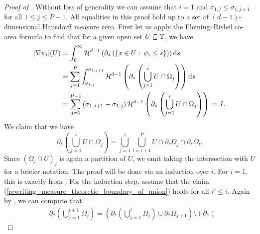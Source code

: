 \begin{proof}[Proof of ]
	Without loss of generality we can assume that $ i = 1 $ and $ \sigma_{ 1, j } \leq \sigma_{ 1, j + 1 } $ for all $ 1 \leq j \leq P - 1 $. 
	All equalities in this proof hold up to a set of $ (d-1)$-dimensional Hausdorff measure zero. First let us apply the Fleming--Rishel co-area formula to find that for a given open set $ U \subseteq \operatorname{\mathbb{T}} $, we have
	\begin{align*}
		\abs{ \nabla \psi_{ i } } ( U ) 
		& =
		\int_{ 0 }^{ \infty }
		\operatorname{\mathcal{H}}^{ d - 1 } \left(
		\partial_{ \ast } \left(
		\left\{
		x \in U 
		\, \colon \,
		\psi_{ i } \leq s 
		\right\}
		\right)
		\right)
		\dd{ s }
		\\
		& =
		\sum_{ j = 1 }^{ P }
		\int_{ \sigma_{ 1, j } }^{ \sigma_{ 1, j + 1 } }
		\operatorname{\mathcal{H}}^{ d - 1 } \left(
		\partial_{ \ast } \left(
		\bigcup_{ j = 1 }^{ i }
		U \cap \Omega_{ j }
		\right)
		\right)
		\dd{ s }
		\\
		& =
		\sum_{ j = 1 }^{ P - 1 }
		\left(\sigma_{ 1, j +1} - \sigma_{ 1 , j } \right)
		\operatorname{\mathcal{H}}^{ d - 1 } \left(
		\partial_{ \ast } \left(
		\bigcup_{ j = 1 }^{ i }
		U \cap \Omega_{ j }
		\right)
		\right)
		\eqqcolon I. 
	\end{align*}
	We claim that we have
	\begin{equation}
		\label{rewriting_measure_theoretic_boundary_of_union}
		\partial_{ \ast } \left(
		\bigcup_{ j = 1 }^{ i }
		U \cap \Omega_{ j }
		\right)
		=
		\bigcup_{ j = 1 }^{ i }
		\bigcup_{ l = i + 1 }^{ P }
		U
		\cap
		\partial_{ \ast } \Omega_{ j }
		\cap
		\partial_{ \ast } \Omega_{ l }.
	\end{equation}
	Since $ ( \Omega_{ j } \cap U )_{ j } $ is again a partition of $ U $, we omit taking the intersection with $ U $ for a briefer notation. The proof will be done via an induction over $ i $. For $ i = 1 $, this is exactly  from . For the induction step, assume that the claim (\ref{rewriting_measure_theoretic_boundary_of_union}) holds for all $ i' \leq i $. Again by  , we can compute that
	\begin{align*}
		& \partial_{ \ast } \left(
		\bigcup_{ j = 1 }^{ i + 1 }
		\Omega_{ j }
		\right)
		=
		\left(
		\partial_{ \ast } \left(
		\bigcup_{ j = 1 }^{ i }
		\Omega_{ j }
		\right)
		\cup
		\partial_{ \ast } \Omega_{ j + 1 }
		\right)
		\setminus
		\left(
		\partial_{ \ast } \left(

\end{align*}
\end{proof}
